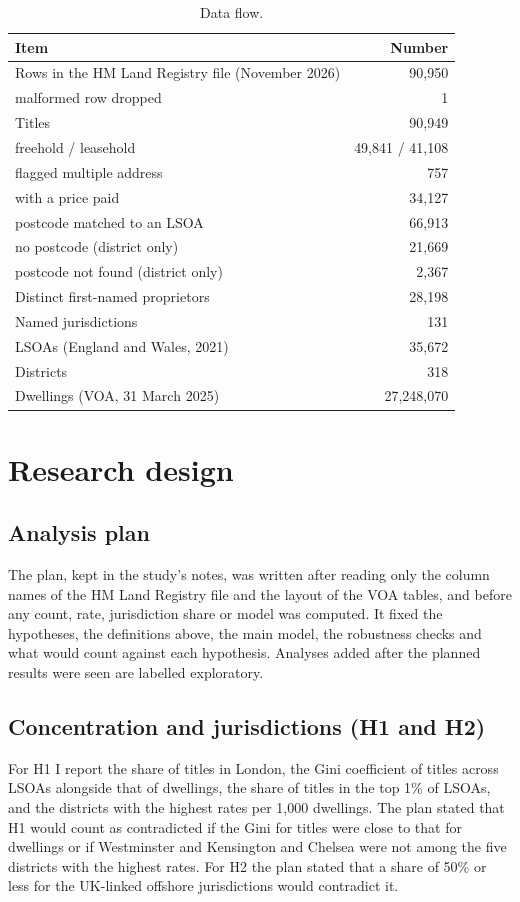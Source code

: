 \documentclass[11pt,a4paper]{article}
\begin{document}
\begin{table}[tbp]\centering\small\caption{Data flow.}\label{tab:data}\begin{tabular}{lr}\toprule Item & Number\\\midrule
Rows in the HM Land Registry file (November 2026) & 90,950\\
\quad malformed row dropped & 1\\
Titles & 90,949\\
\quad freehold / leasehold & 49,841 / 41,108\\
\quad flagged multiple address & 757\\
\quad with a price paid & 34,127\\
\quad postcode matched to an LSOA & 66,913\\
\quad no postcode (district only) & 21,669\\
\quad postcode not found (district only) & 2,367\\
Distinct first-named proprietors & 28,198\\
Named jurisdictions & 131\\\midrule
LSOAs (England and Wales, 2021) & 35,672\\
Districts & 318\\
Dwellings (VOA, 31 March 2025) & 27,248,070\\\bottomrule\end{tabular}\end{table}

\section{Research design}\label{sec:design}
\subsection{Analysis plan}
The plan, kept in the study's notes, was written after reading only the column names of the HM Land Registry file and the layout of the VOA tables, and before any count, rate, jurisdiction share or model was computed. It fixed the hypotheses, the definitions above, the main model, the robustness checks and what would count against each hypothesis. Analyses added after the planned results were seen are labelled exploratory.

\subsection{Concentration and jurisdictions (H1 and H2)}
For H1 I report the share of titles in London, the Gini coefficient of titles across LSOAs alongside that of dwellings, the share of titles in the top 1\% of LSOAs, and the districts with the highest rates per 1,000 dwellings. The plan stated that H1 would count as contradicted if the Gini for titles were close to that for dwellings or if Westminster and Kensington and Chelsea were not among the five districts with the highest rates. For H2 the plan stated that a share of 50\% or less for the UK-linked offshore jurisdictions would contradict it.
\end{document}
